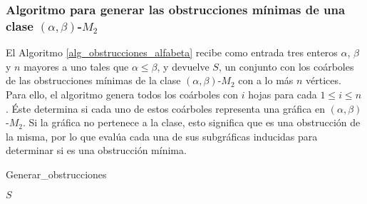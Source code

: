 \subsubsection{Algoritmo para generar las obstrucciones mínimas de una clase $(\alpha,\beta)$-$M_2$}

El Algoritmo \ref{alg_obstrucciones_alfabeta} recibe como entrada tres enteros $\alpha$, $\beta$ y $n$ mayores a uno tales que $\alpha \le \beta$, y devuelve $S$, un conjunto con los coárboles de las obstrucciones mínimas de la clase $(\alpha,\beta)$-$M_2$ con a lo más $n$ vértices. Para ello, el algoritmo genera todos los coárboles con $i$ hojas para cada $1\le i \le n$ \cite{Jones}. Éste determina si cada uno de estos coárboles representa una gráfica en $(\alpha,\beta)$-$M_2$. Si la gráfica no pertenece a la clase, esto significa que es una obstrucción de la misma, por lo que evalúa cada una de sus subgráficas inducidas para determinar si es una obstrucción mínima.

\begin{algorithm}[ht!]
\caption{Generar\_obstrucciones}
\label{alg_obstrucciones_alfabeta}
\DontPrintSemicolon %


\Return $S$\;

\end{algorithm}
